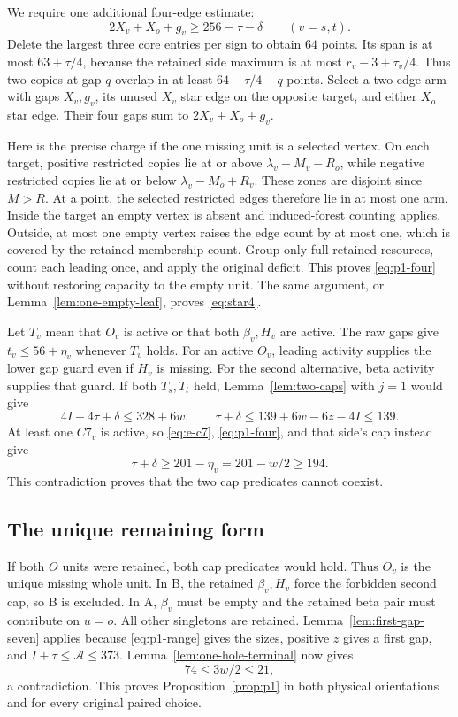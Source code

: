 \documentclass[11pt,letterpaper]{article}
\theoremstyle{definition}\newtheorem{definition}[theorem]{Definition}
\begin{document}
We require one additional four-edge estimate:
\begin{equation}\label{eq:p1-four}
2X_v+X_o+g_v\ge256-\tau-\delta\qquad(v=s,t).
\end{equation}
Delete the largest three core entries per sign to obtain $64$ points. Its span is at most $63+\tau/4$, because the retained side maximum is at most $r_v-3+\tau_v/4$. Thus two copies at gap $q$ overlap in at least $64-\tau/4-q$ points. Select a two-edge arm with gaps $X_v,g_v$, its unused $X_v$ star edge on the opposite target, and either $X_o$ star edge. Their four gaps sum to $2X_v+X_o+g_v$.

Here is the precise charge if the one missing unit is a selected vertex. On each target, positive restricted copies lie at or above $\lambda_v+M_v-R_o$, while negative restricted copies lie at or below $\lambda_v-M_o+R_v$. These zones are disjoint since $M>R$. At a point, the selected restricted edges therefore lie in at most one arm. Inside the target an empty vertex is absent and induced-forest counting applies. Outside, at most one empty vertex raises the edge count by at most one, which is covered by the retained membership count. Group only full retained resources, count each leading once, and apply the original deficit. This proves \eqref{eq:p1-four} without restoring capacity to the empty unit. The same argument, or Lemma~\ref{lem:one-empty-leaf}, proves \eqref{eq:star4}.

Let $T_v$ mean that $O_v$ is active or that both $\beta_v,H_v$ are active. The raw gaps give $t_v\le56+\eta_v$ whenever $T_v$ holds. For an active $O_v$, leading activity supplies the lower gap guard even if $H_v$ is missing. For the second alternative, beta activity supplies that guard. If both $T_s,T_t$ held, Lemma~\ref{lem:two-caps} with $j=1$ would give
\[
4I+4\tau+\delta\le328+6w,
\qquad \tau+\delta\le139+6w-6z-4I\le139.
\]
At least one $C7_v$ is active, so \eqref{eq:e-c7}, \eqref{eq:p1-four}, and that side's cap instead give
\[
\tau+\delta\ge201-\eta_v=201-w/2\ge194.
\]
This contradiction proves that the two cap predicates cannot coexist.

\subsection{The unique remaining form}
If both $O$ units were retained, both cap predicates would hold. Thus $O_v$ is the unique missing whole unit. In B, the retained $\beta_v,H_v$ force the forbidden second cap, so B is excluded. In A, $\beta_v$ must be empty and the retained beta pair must contribute on $u=o$. All other singletons are retained. Lemma~\ref{lem:first-gap-seven} applies because \eqref{eq:p1-range} gives the sizes, positive $z$ gives a first gap, and $I+\tau\le\mathcal A\le373$. Lemma~\ref{lem:one-hole-terminal} now gives
\[
74\le3w/2\le21,
\]
a contradiction. This proves Proposition~\ref{prop:p1} in both physical orientations and for every original paired choice.
\end{document}
